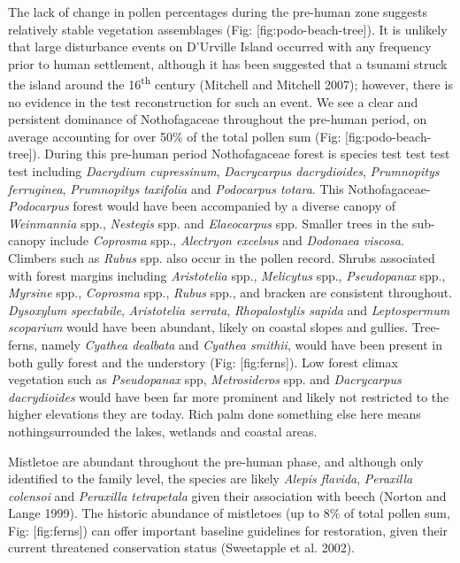 \documentclass[]{article}
\begin{document}
The lack of change in pollen percentages during the pre-human zone suggests relatively stable vegetation assemblages (Fig: {[}fig:podo-beach-tree{]}). It is unlikely that large disturbance events on D'Urville Island occurred with any frequency prior to human settlement, although it has been suggested that a tsunami struck the island around the 16\textsuperscript{th} century (Mitchell and Mitchell 2007); however, there is no evidence in the test reconstruction for such an event. We see a clear and persistent dominance of Nothofagaceae throughout the pre-human period, on average accounting for over 50\% of the total pollen sum (Fig: {[}fig:podo-beach-tree{]}). During this pre-human period Nothofagaceae forest is species test test test test including \emph{Dacrydium cupressinum}, \emph{Dacrycarpus dacrydioides}, \emph{Prumnopitys ferruginea}, \emph{Prumnopitys taxifolia} and \emph{Podocarpus totara}. This Nothofagaceae-\emph{Podocarpus} forest would have been accompanied by a diverse canopy of \emph{Weinmannia} spp., \emph{Nestegis} spp. and \emph{Elaeocarpus} spp. Smaller trees in the sub-canopy include \emph{Coprosma} spp., \emph{Alectryon excelsus} and \emph{Dodonaea viscosa}. Climbers such as \emph{Rubus} spp. also occur in the pollen record. Shrubs associated with forest margins including \emph{Aristotelia} spp., \emph{Melicytus} spp., \emph{Pseudopanax} spp., \emph{Myrsine} spp., \emph{Coprosma} spp., \emph{Rubus} spp., and bracken are consistent throughout. \emph{Dysoxylum spectabile}, \emph{Aristotelia serrata}, \emph{Rhopalostylis sapida} and \emph{Leptospermum scoparium} would have been abundant, likely on coastal slopes and gullies. Tree-ferns, namely \emph{Cyathea dealbata} and \emph{Cyathea smithii}, would have been present in both gully forest and the understory (Fig: {[}fig:ferns{]}). Low forest climax vegetation such as \emph{Pseudopanax} spp, \emph{Metrosideros} spp. and \emph{Dacrycarpus dacrydioides} would have been far more prominent and likely not restricted to the higher elevations they are today. Rich palm done something else here means nothingsurrounded the lakes, wetlands and coastal areas.

Mistletoe are abundant throughout the pre-human phase, and although only identified to the family level, the species are likely \emph{Alepis flavida}, \emph{Peraxilla colensoi} and \emph{Peraxilla tetrapetala} given their association with beech (Norton and Lange 1999). The historic abundance of mistletoes (up to 8\% of total pollen sum, Fig: {[}fig:ferns{]}) can offer important baseline guidelines for restoration, given their current threatened conservation status (Sweetapple et al. 2002).
\end{document}
